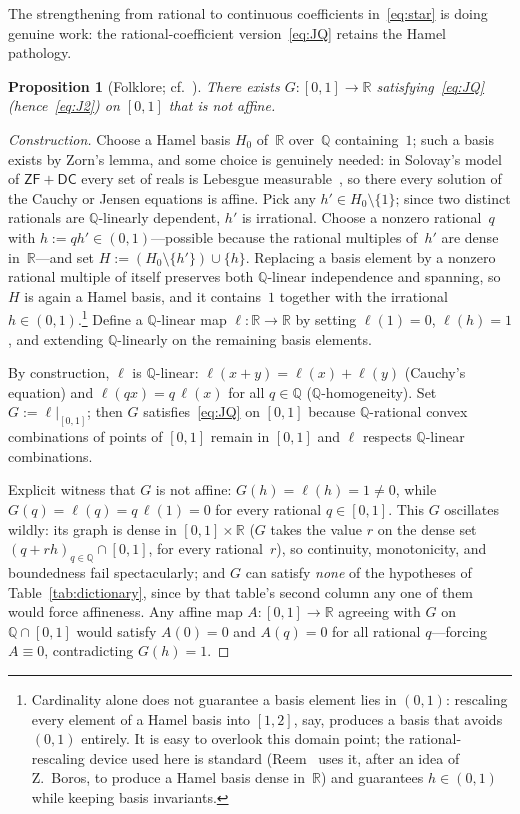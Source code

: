 \documentclass{article}
\theoremstyle{plain}
\newtheorem{proposition}[theorem]{Proposition}
\theoremstyle{definition}
\newcommand{\R}{\mathbb{R}}
\newcommand{\Q}{\mathbb{Q}}
\begin{document}
The strengthening from rational to continuous coefficients
in~\eqref{eq:star} is doing genuine work: the rational-coefficient
version~\eqref{eq:JQ} retains the Hamel pathology.

\begin{proposition}[Folklore; cf.~{\cite[\S\S5.2 and~13.2]{Kuczma2009}}]%
\label{prop:JQ-pathology}
There exists $G\colon[0,1]\to\R$ satisfying~\eqref{eq:JQ}
(hence~\eqref{eq:J2}) on $[0,1]$ that is not affine.
\end{proposition}

\begin{proof}[Construction]
Choose a Hamel basis $H_0$ of~$\R$ over~$\Q$ containing~$1$; such a
basis exists by Zorn's lemma, and some choice is genuinely needed: in
Solovay's model of $\mathsf{ZF}+\mathsf{DC}$ every set of reals is
Lebesgue measurable~\cite{Solovay1970}, so there every solution of the
Cauchy or Jensen equations is affine.
Pick
any $h'\in H_0\setminus\{1\}$; since two distinct rationals are
$\Q$-linearly dependent, $h'$ is irrational. Choose a nonzero rational~$q$
with $h:=qh'\in(0,1)$---possible because the rational multiples of~$h'$
are dense in~$\R$---and set $H:=(H_0\setminus\{h'\})\cup\{h\}$.
Replacing a basis element by a nonzero rational multiple of itself
preserves both $\Q$-linear independence and spanning, so $H$ is again
a Hamel basis, and it contains~$1$ together with the irrational
$h\in(0,1)$.\footnote{Cardinality alone does not guarantee a basis element
lies in $(0,1)$: rescaling every element of a Hamel basis into $[1,2]$, say,
produces a basis that avoids $(0,1)$ entirely. It is easy to overlook
this domain point; the rational-rescaling
device used here is standard (Reem~\cite[Remark~3.4]{Reem2017} uses
it, after an idea of Z.~Boros, to produce a Hamel basis dense
in~$\R$) and guarantees $h \in (0,1)$ while keeping basis invariants.} Define a $\Q$-linear map $\ell\colon\R\to\R$ by setting
$\ell(1)=0$, $\ell(h)=1$, and extending $\Q$-linearly on the remaining
basis elements.

By construction, $\ell$ is $\Q$-linear: $\ell(x+y)=\ell(x)+\ell(y)$
(Cauchy's equation) and $\ell(qx)=q\,\ell(x)$ for all $q\in\Q$
($\Q$-homogeneity). Set $G:=\ell|_{[0,1]}$; then $G$
satisfies~\eqref{eq:JQ} on $[0,1]$ because $\Q$-rational convex
combinations of points of $[0,1]$ remain in $[0,1]$ and $\ell$
respects $\Q$-linear combinations.

Explicit witness that $G$ is not affine: $G(h)=\ell(h)=1\ne0$, while
$G(q)=\ell(q)=q\,\ell(1)=0$ for every rational $q\in[0,1]$. This $G$
oscillates wildly: its graph is dense in $[0,1]\times\R$ ($G$ takes the
value $r$ on the dense set $(q+rh)_{q\in\Q}\cap[0,1]$, for every
rational~$r$), so continuity, monotonicity, and boundedness fail
spectacularly; and $G$ can satisfy \emph{none} of the hypotheses of
Table~\ref{tab:dictionary}, since by that table's second column any one
of them would force affineness. Any affine map $A\colon[0,1]\to\R$ agreeing with $G$ on
$\Q\cap[0,1]$ would satisfy $A(0)=0$ and $A(q)=0$ for all rational
$q$---forcing $A\equiv0$, contradicting $G(h)=1$.
\end{proof}
\end{document}
